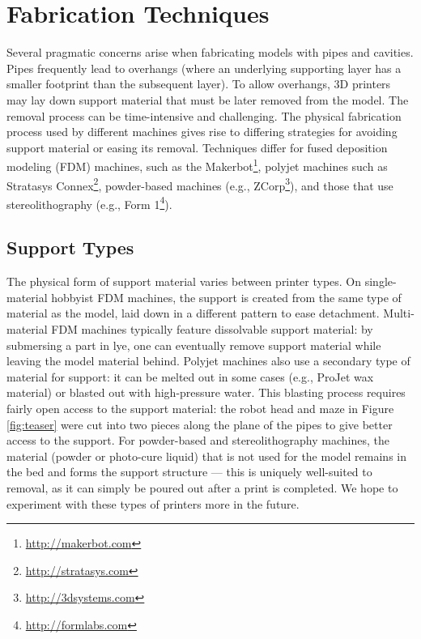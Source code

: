 \section{Fabrication Techniques}
Several pragmatic concerns arise when fabricating models with pipes and cavities. Pipes frequently lead to overhangs (where an underlying supporting layer has a smaller footprint than the subsequent layer).
To allow overhangs, 3D printers may lay down support material that must be later removed from the model.  The removal process can be time-intensive and challenging.  The physical fabrication process used by different machines gives rise to differing strategies for avoiding support material or easing its removal.  Techniques differ for fused deposition modeling (FDM) machines, such as the Makerbot\footnote{\url{http://makerbot.com}}, polyjet machines such as Stratasys Connex\footnote{\url{http://stratasys.com}},  powder-based machines (e.g., ZCorp\footnote{\url{http://3dsystems.com}}), and those that use stereolithography (e.g., Form 1\footnote{\url{http://formlabs.com}}).

\subsection{Support Types}
The physical form of support material varies between printer types.  On single-material hobbyist FDM machines, the support is created from the same type of material as the model, laid down in a different pattern to ease detachment.  Multi-material FDM machines typically feature dissolvable support material: by submersing a part in lye, one can eventually remove support material while leaving the model material behind.  Polyjet machines also use a secondary type of material for support: it can be melted out in some cases (e.g., ProJet wax material) or blasted out with high-pressure water.  This blasting process requires fairly open access to the support material: the robot head and maze in Figure \ref{fig:teaser} were cut into two pieces along the plane of the pipes to give better access to the support.  For powder-based and stereolithography machines, the material (powder or photo-cure liquid) that is not used for the model remains in the bed and forms the support structure --- this is uniquely well-suited to removal, as it can simply be poured out after a print is completed.  We hope to experiment with these types of printers more in the future.

